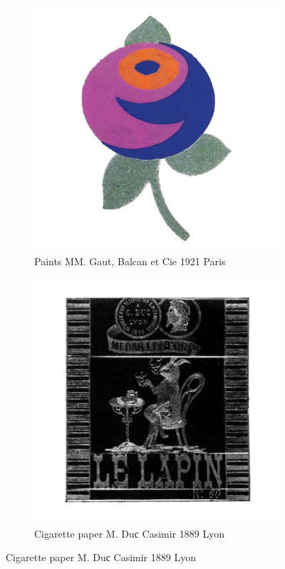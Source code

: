 \begin{figure}[h]
  \begin{subfigure}{.45\textwidth}
    \centering
    \includegraphics[width=.5\linewidth]{images/supplement/trademarks/french/9_21}
    \caption{Paints MM. Gaut, Balcan et Cie 1921 Paris}
    \label{fig:trademarks:french:9.21}
  \end{subfigure}\hfill
  \begin{subfigure}{.45\textwidth}
    \centering
    \includegraphics[width=.5\linewidth]{images/supplement/trademarks/french/10_5}
    \caption{Cigarette paper M. Duс Casimir 1889 Lyon}
    \label{fig:trademarks:french:10.5}
  \end{subfigure}


\end{figure}
